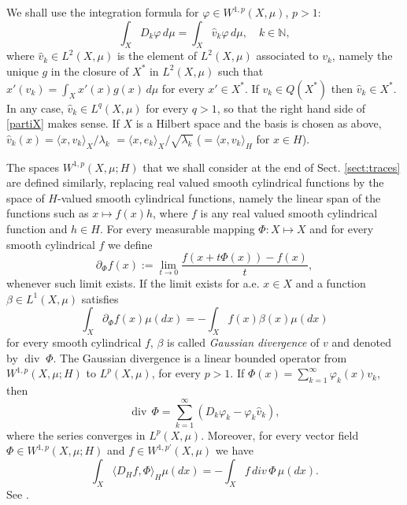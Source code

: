 \documentclass[reqno,twoside,12pt]{amsart}
\begin{document}
We shall use the integration  formula for  
$\varphi \in W^{1,p}(X, \mu)$, $p>1$:
\begin{equation}
\label{partiX} 
\int_{X} D_k\varphi \,d\mu =   \int_{X}\hat{v}_k\varphi \,d\mu , \quad k\in {\mathbb N} ,
\end{equation}
where $ \hat{v}_k \in L^2(X, \mu)$ is the element of $L^2(X, \mu)$ associated to $v_k$, namely the
unique  $g $ in the closure of $X^*$ in $L^2(X, \mu)$ such that $x'(v_k) = \int_X x'(x)g(x)\,d\mu$ for every $x'\in X^*$. 
If $v_k\in Q(X^*)$ then $ \hat{v}_k \in X^*$. In any case, $ \hat{v}_k \in L^q(X, \mu)$ for every $q>1$, so that the right hand side of \eqref{partiX}  makes sense. 
 If $X$ is a Hilbert space and the basis is chosen as above, $\hat{v}_k(x) =  \langle x, v_k\rangle_X /\lambda_k$ $= \langle x, e_k\rangle_X /\sqrt{\lambda_k}$ ($=\langle x, v_k\rangle_H $ for $x\in H$). 

\vspace{3mm}

The spaces $W^{1,p}(X, \mu; H)$ that we shall consider at the end of Sect. \ref{sect:traces} are defined similarly, replacing real valued smooth cylindrical functions by the space of  $H$-valued smooth cylindrical functions, namely  the linear span of the functions such as $x\mapsto f(x)h$, where $f$ is any real valued smooth cylindrical function and $h\in H$. 
For every measurable mapping $\Phi :X\mapsto X$ and for every smooth cylindrical $f$ we define
$$\partial _{\Phi} f(x) := \lim_{t\to 0} \frac{f(x+t\Phi (x)) - f(x)}{t} , $$
whenever such limit exists. If the limit exists for a.e. $x\in X$ and a function $\beta \in L^1(X, \mu)$ satisfies
$$ \int_X \partial _{\Phi} f(x) \mu(dx) = - \int_X f(x) \beta(x) \mu(dx) $$
for every smooth cylindrical $f$, $\beta$ is called {\em Gaussian divergence} of $v$ and denoted by ${\operatorname{div}} \;\Phi$. The Gaussian divergence is a linear bounded operator from $W^{1,p}(X, \mu; H)$ to $L^p(X, \mu)$, for every $p>1$. If $\Phi (x) = \sum_{k=1}^{\infty} \varphi_k(x) v_k$, then
$${\operatorname{div}}\,\Phi = \sum_{k=1}^{\infty} (D_k\varphi_k - \varphi_k \hat{v}_k), $$
where the series converges in $L^p(X, \mu)$. Moreover, for every vector field $\Phi\in W^{1,p}(X, \mu; H)$ and $f\in W^{1,p'}(X, \mu)$ we have
$$\int_X \langle D_Hf, \Phi\rangle_H \mu(dx) = - \int_X f\, div\,\Phi\, \mu(dx). $$
See \cite[\S 5.8]{Boga}. 

\vspace{3mm}
\end{document}
